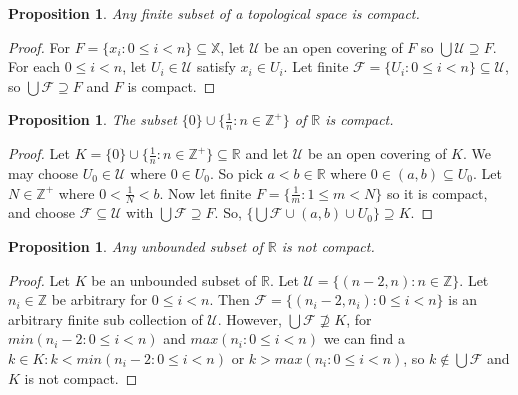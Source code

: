 \documentclass{amsart}
\theoremstyle{plain}
\newtheorem{proposition}[theorem]{Proposition}
\theoremstyle{definition}
\theoremstyle{remark}
\begin{document}
	\begin{proposition}
	  Any finite subset of a topological space is compact.
	\end{proposition}

	\begin{proof}
	For $F = \lbrace x_i : 0 \leq i < n \rbrace \subseteq \mathbb{X}$, let $\mathcal{U}$ be an open covering of $F$ so $\bigcup \mathcal{U} \supseteq F$. For each $0 \leq i < n$, let $U_i \in \mathcal{U}$ satisfy $x_i \in U_i$. Let finite $\mathcal{F} = \lbrace U_i : 0 \leq i < n \rbrace \subseteq \mathcal{U}$, so $\bigcup \mathcal{F} \supseteq F$ and $F$ is compact.
	\end{proof}

	\begin{proposition}
	  The subset \(\{0\}\cup\{\frac{1}{n}:n\in\mathbb Z^+\}\) of \(\mathbb R\) is compact.
	\end{proposition}

	\begin{proof}
	Let $K = \lbrace 0 \rbrace \cup \lbrace \frac{1}{n} : n \in \mathbb{Z^+} \rbrace \subseteq \mathbb{R}$ and let $\mathcal{U}$ be an open covering of $K$. We may choose $U_0 \in \mathcal{U}$ where $0 \in U_0$. So pick $a<b \in \mathbb{R}$ where $0 \in (a, b) \subseteq U_0$. Let $N \in \mathbb{Z}^+$ where $0 < \frac{1}{N} < b$. Now let finite $F = \lbrace \frac{1}{m} : 1 \leq m < N \rbrace$ so it is compact, and choose $\mathcal{F} \subseteq \mathcal{U}$ with $\bigcup \mathcal{F} \supseteq F$. So, $\lbrace \bigcup \mathcal{F} \cup (a,b) \cup U_0 \rbrace \supseteq K$.
	\end{proof}

	\begin{proposition}
	  Any unbounded subset of \(\mathbb R\) is not compact.
	\end{proposition}
	\begin{proof}
	Let $K$ be an unbounded subset of $\mathbb{R}$. Let $\mathcal{U} = \lbrace (n-2, n) : n \in \mathbb{Z} \rbrace$. Let $n_i \in \mathbb{Z}$ be arbitrary for $0 \leq i < n$. Then $\mathcal{F} = \lbrace (n_i - 2, n_i) : 0 \leq i < n \rbrace$ is an arbitrary finite sub collection of $\mathcal{U}$. However, $\bigcup \mathcal{F} \not\supseteq K$, for $min(n_i-2: 0 \leq i < n)$ and $max(n_i : 0 \leq i < n)$ we can find a $k \in K : k < min(n_i-2: 0 \leq i < n)$ or $k > max(n_i : 0 \leq i < n)$, so $k  \not\in \bigcup \mathcal{F}$ and $K$ is not compact.
	\end{proof}	
\end{document}
